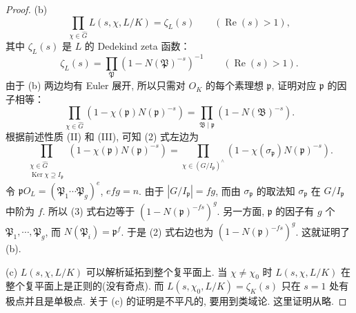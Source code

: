 \begin{proof}
(b)
\[
  \prod_{\chi\in\widehat{G}}L(s,\chi,L/K)=\zeta_L(s)\qquad(\operatorname{Re}(s)>1),
\]
其中 $\zeta_L(s)$ 是 $L$ 的 Dedekind zeta 函数：
\[
  \zeta_L(s)=\prod_{\mathfrak{P}}(1-N(\mathfrak{P})^{-s})^{-1}\qquad(\operatorname{Re}(s)>1).
\]
由于 (b) 两边均有 Euler 展开, 所以只需对 $O_K$ 的每个素理想 $\mathfrak{p}$, 证明对应 $\mathfrak{p}$ 的因子相等：
\begin{equation}\tag{2}
  \prod_{\chi\in\widehat{G}}(1-\chi(\mathfrak{p})N(\mathfrak{p})^{-s})=\prod_{\mathfrak{B}\mid\mathfrak{p}}(1-N(\mathfrak{B})^{-s}).
\end{equation}
根据前述性质 (II) 和 (III), 可知 (2) 式左边为
\begin{equation}\tag{3}
  \prod_{\substack{\chi\in\widehat{G}\\ \operatorname{Ker}\chi\supseteq I_{\mathfrak{p}}}}(1-\chi(\mathfrak{p})N(\mathfrak{p})^{-s})
  =\prod_{\chi\in(G/I_{\mathfrak{p}})^{\wedge}}(1-\chi(\sigma_{\mathfrak{p}})N(\mathfrak{p})^{-s}).
\end{equation}
令 $\mathfrak{p}O_L=(\mathfrak{P}_1\cdots\mathfrak{P}_g)^e$, $efg=n$. 由于 $|G/I_{\mathfrak{p}}|=fg$, 而由 $\sigma_{\mathfrak{p}}$ 的取法知 $\sigma_{\mathfrak{p}}$ 在 $G/I_{\mathfrak{p}}$ 中阶为 $f$. 所以 (3) 式右边等于 $(1-N(\mathfrak{p})^{-fs})^g$. 另一方面, $\mathfrak{p}$ 的因子有 $g$ 个 $\mathfrak{P}_1,\cdots,\mathfrak{P}_g$, 而 $N(\mathfrak{P}_i)=\mathfrak{p}^f$. 于是 (2) 式右边也为 $(1-N(\mathfrak{p})^{-fs})^g$. 这就证明了 (b). 

(c) $L(s,\chi,L/K)$ 可以解析延拓到整个复平面上. 当 $\chi\neq\chi_0$ 时 $L(s,\chi,L/K)$ 在整个复平面上是正则的(没有奇点). 而 $L(s,\chi_0,L/K)=\zeta_K(s)$ 只在 $s=1$ 处有极点并且是单极点. 关于 (c) 的证明是不平凡的, 要用到类域论. 这里证明从略. 


\end{proof}
